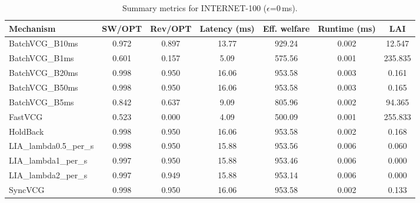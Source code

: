 \begin{table}[t]
\centering
\small
\setlength{\tabcolsep}{6pt}
\begin{tabular}{lcccccc}
\toprule
Mechanism & SW/OPT & Rev/OPT & Latency (ms) & Eff. welfare & Runtime (ms) & LAI \\
\midrule
BatchVCG_B10ms & 0.972 & 0.897 & 13.77 & 929.24 & 0.002 & 12.547 \\
BatchVCG_B1ms & 0.601 & 0.157 & 5.09 & 575.56 & 0.001 & 235.835 \\
BatchVCG_B20ms & 0.998 & 0.950 & 16.06 & 953.58 & 0.003 & 0.161 \\
BatchVCG_B50ms & 0.998 & 0.950 & 16.06 & 953.58 & 0.003 & 0.165 \\
BatchVCG_B5ms & 0.842 & 0.637 & 9.09 & 805.96 & 0.002 & 94.365 \\
FastVCG & 0.523 & 0.000 & 4.09 & 500.09 & 0.001 & 255.833 \\
HoldBack & 0.998 & 0.950 & 16.06 & 953.58 & 0.002 & 0.168 \\
LIA_lambda0.5_per_s & 0.998 & 0.950 & 15.88 & 953.56 & 0.006 & 0.060 \\
LIA_lambda1_per_s & 0.997 & 0.950 & 15.88 & 953.46 & 0.006 & 0.000 \\
LIA_lambda2_per_s & 0.997 & 0.949 & 15.88 & 953.14 & 0.006 & 0.000 \\
SyncVCG & 0.998 & 0.950 & 16.06 & 953.58 & 0.002 & 0.133 \\
\bottomrule
\end{tabular}
\caption{Summary metrics for INTERNET-100 ($\epsilon$=0\,ms).}
\label{tab:internet100_eps0p0}
\end{table}
